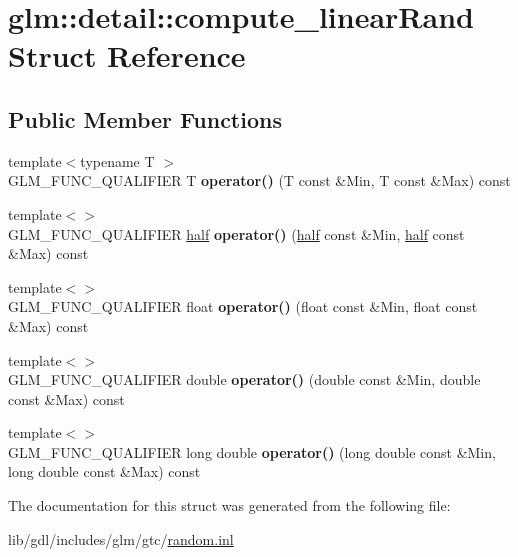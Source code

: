 \hypertarget{structglm_1_1detail_1_1compute__linear_rand}{}\section{glm\+:\+:detail\+:\+:compute\+\_\+linear\+Rand Struct Reference}
\label{structglm_1_1detail_1_1compute__linear_rand}
\subsection*{Public Member Functions}
\begin{DoxyCompactItemize}
\item 
\hypertarget{structglm_1_1detail_1_1compute__linear_rand_ac852e16d66ba80ff5309238b3f494b99}{}{\footnotesize template$<$typename T $>$ }\\G\+L\+M\+\_\+\+F\+U\+N\+C\+\_\+\+Q\+U\+A\+L\+I\+F\+I\+E\+R T {\bfseries operator()} (T const \&Min, T const \&Max) const \label{structglm_1_1detail_1_1compute__linear_rand_ac852e16d66ba80ff5309238b3f494b99}

\item 
\hypertarget{structglm_1_1detail_1_1compute__linear_rand_a544b94bdfbdcf46c2689208e75f85612}{}{\footnotesize template$<$$>$ }\\G\+L\+M\+\_\+\+F\+U\+N\+C\+\_\+\+Q\+U\+A\+L\+I\+F\+I\+E\+R \hyperlink{classglm_1_1detail_1_1half}{half} {\bfseries operator()} (\hyperlink{classglm_1_1detail_1_1half}{half} const \&Min, \hyperlink{classglm_1_1detail_1_1half}{half} const \&Max) const \label{structglm_1_1detail_1_1compute__linear_rand_a544b94bdfbdcf46c2689208e75f85612}

\item 
\hypertarget{structglm_1_1detail_1_1compute__linear_rand_aeb6d4f603a9afa05544d65233064f2e9}{}{\footnotesize template$<$$>$ }\\G\+L\+M\+\_\+\+F\+U\+N\+C\+\_\+\+Q\+U\+A\+L\+I\+F\+I\+E\+R float {\bfseries operator()} (float const \&Min, float const \&Max) const \label{structglm_1_1detail_1_1compute__linear_rand_aeb6d4f603a9afa05544d65233064f2e9}

\item 
\hypertarget{structglm_1_1detail_1_1compute__linear_rand_a60dd37b36082f1a8dbfb8d34f0d5575c}{}{\footnotesize template$<$$>$ }\\G\+L\+M\+\_\+\+F\+U\+N\+C\+\_\+\+Q\+U\+A\+L\+I\+F\+I\+E\+R double {\bfseries operator()} (double const \&Min, double const \&Max) const \label{structglm_1_1detail_1_1compute__linear_rand_a60dd37b36082f1a8dbfb8d34f0d5575c}

\item 
\hypertarget{structglm_1_1detail_1_1compute__linear_rand_ab5433863c50ed60a1ce5ac941759428f}{}{\footnotesize template$<$$>$ }\\G\+L\+M\+\_\+\+F\+U\+N\+C\+\_\+\+Q\+U\+A\+L\+I\+F\+I\+E\+R long double {\bfseries operator()} (long double const \&Min, long double const \&Max) const \label{structglm_1_1detail_1_1compute__linear_rand_ab5433863c50ed60a1ce5ac941759428f}

\end{DoxyCompactItemize}


The documentation for this struct was generated from the following file\+:\begin{DoxyCompactItemize}
\item 
lib/gdl/includes/glm/gtc/\hyperlink{random_8inl}{random.\+inl}\end{DoxyCompactItemize}
